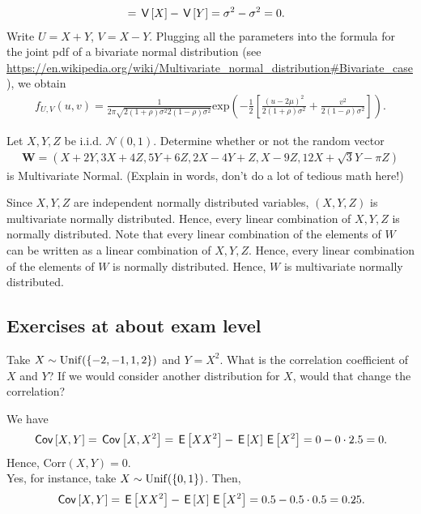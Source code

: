 \documentclass[assignments]{subfiles}
\begin{document}
\begin{exercise}
\begin{solution}
\begin{enumerate}
\begin{align}
&= \,\mathsf{V}\left[X\right] - \,\mathsf{V}\left[Y\right] = \sigma^2 - \sigma^2 = 0.
    \end{align}
    Write $U = X+Y$, $V = X - Y$. Plugging all the parameters into the formula for the joint pdf of a bivariate normal distribution (see \url{https://en.wikipedia.org/wiki/Multivariate_normal_distribution#Bivariate_case}), we obtain
    \begin{align}
        f_{U,V}(u,v) = \frac{1}{2\pi\sqrt{2(1+\rho)\sigma^2 2(1-\rho)\sigma^2} } \text{exp}\left(-\frac{1}{2}\left[\frac{(u - 2\mu)^2}{2(1+\rho)\sigma^2} + \frac{v^2}{2(1-\rho)\sigma^2} \right]\right).
    \end{align}
\end{enumerate}
\end{solution}
\end{exercise}

\begin{exercise}
Let $X, Y, Z$ be i.i.d. $\mathcal{N}(0,1).$ Determine whether or not the random vector
\begin{align*}
    \mathbf{W} = (X+2Y, 3X+4Z, 5Y+6Z, 2X-4Y+Z, X-9Z, 12X+\sqrt{3}Y -\pi Z)
\end{align*}
is Multivariate Normal. (Explain in words, don't do a lot of tedious math here!)
\begin{solution}
Since $X,Y,Z$ are independent normally distributed variables, $(X,Y,Z)$ is multivariate normally distributed. Hence, every linear combination of $X,Y,Z$ is normally distributed. Note that every linear combination of the elements of $W$ can be written as a linear combination of $X,Y,Z$. Hence, every linear combination of the elements of $W$ is normally distributed. Hence, $W$ is multivariate normally distributed.
\end{solution}
\end{exercise}


\subsection{Exercises at about exam level}
\label{sec:exercises-at-about}





\begin{exercise}
Take $X\sim\mathrm{Unif}(\{-2, -1, 1, 2\})$ and $Y= X^2$. What is the correlation coefficient of $X$ and $Y$?
If we would consider another distribution for $X$, would that change the correlation?
\begin{solution}
We have
\begin{align}
    \,\mathsf{Cov}\left[X,Y\right] = \,\mathsf{Cov}\left[X,X^2\right] = \,\mathsf{E}\left[XX^2\right] - \,\mathsf{E}\left[X\right]\,\mathsf{E}\left[X^2\right] = 0 - 0\cdot 2.5 = 0.
\end{align}
Hence, $\text{Corr}(X,Y) = 0$. \\
Yes, for instance, take $X \sim \mathrm{Unif}(\{0,1\})$. Then,
\begin{align}
    \,\mathsf{Cov}\left[X,Y\right] = \,\mathsf{E}\left[XX^2\right] - \,\mathsf{E}\left[X\right]\,\mathsf{E}\left[X^2\right] = 0.5 - 0.5\cdot 0.5 = 0.25.
\end{align}
\end{solution}
\end{exercise}
\end{document}
